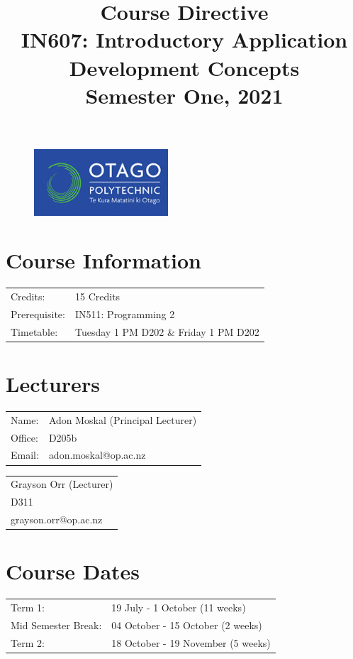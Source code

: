 \documentclass{article}
\author{}
\begin{document}
\begin{figure}
	\includegraphics[width=50mm]{../img/logo.png} 
\end{figure}

\title{Course Directive\\IN607: Introductory Application Development Concepts\\Semester One, 2021}
\date{}
\maketitle

\section*{Course Information}
\begin{tabular}{ll}
	Credits:            & 15 Credits                             \\
	Prerequisite:       & IN511: Programming 2                   \\
	Timetable:  & Tuesday 1 PM D202 \& Friday 1 PM D202       
\end{tabular} 

\section*{Lecturers}
\begin{tabular}{ll}
	Name:   & Adon Moskal (Principal Lecturer) \\
	Office: & D205b                            \\
	Email:  & adon.moskal@op.ac.nz             \\
\end{tabular}
\begin{tabular}{l}
	Grayson Orr (Lecturer) \\
	D311                   \\
	grayson.orr@op.ac.nz   \\
\end{tabular}

\section*{Course Dates}
\begin{tabular}{ll}
	Term 1:             & 19 July - 1 October (11 weeks) \\
	Mid Semester Break: & 04 October - 15 October (2 weeks)    \\
	Term 2:             & 18 October - 19 November (5 weeks)        \\     
\end{tabular}
\end{document}
